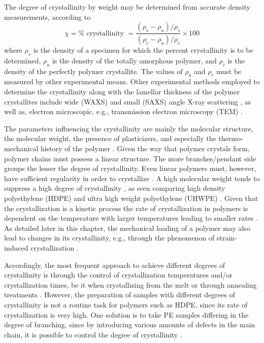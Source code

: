 The degree of crystallinity by weight may be determined from accurate density measurements, according to
\begin{equation}
	\chi = \% \text { crystallinity }=\frac{\left(\rho_{s}-\rho_{a}\right)/\rho_{s}}{\left(\rho_{c}-\rho_{a}\right)/\rho_{c}} \times 100
\end{equation}
where $\rho_{s}$ is the density of a specimen for which the percent crystallinity is to be determined, $\rho_{a}$ is the density of the totally amorphous polymer, and $\rho_{c}$ is the density of the perfectly polymer crystallite.
The values of $\rho_{a}$ and $\rho_{c}$ must be measured by other experimental means.
Other experimental methods employed to determine the crystallinity along with the lamellar thickness of the polymer crystallites include wide (WAXS) and small (SAXS) angle X-ray scattering \citep{schrauwenIntrinsicDeformationBehavior2004, hobeikaTemperatureStrainRate2000}, as well as, electron microscopic, e.g., transmission electron microscopy (TEM) \citep{bartczakEvolutionCrystallineTexture1992}.

The parameters influencing the crystallinity are mainly the molecular structure, the molecular weight, the presence of plasticizers, and especially the thermo-mechanical history of the polymer \citep{khouryMorphologyCrystallineSynthetic1976, cangemiTwoPhaseModelMechanical2001}.
Given the way that polymer crystals form, polymer chains must possess a linear structure.
The more branches/pendant side groups the lesser the degree of crystallinity.
Even linear polymers must, however, have sufficient regularity in order to crystallize \citep{khouryMorphologyCrystallineSynthetic1976}.
A high molecular weight tends to suppress a high degree of crystallinity \citep{hoffmanAnalysisRelaxationsPolychlorotrifluoroethylene2007}, as seen comparing high density polyethylene (HDPE) and ultra high weight polyethylene (UHWPE) \citep{brownInfluenceMolecularConformation2007}.
Given that the crystallization is a kinetic process the rate of crystallization in polymers is dependent on the temperature with larger temperatures leading to smaller rates \citep{callister2014materials}.
As detailed later in this chapter, the mechanical loading of a polymer may also lead to changes in its crystallinity, e.g., through the phenomenon of strain-induced crystallization \citep{raoStudyStraininducedCrystallization2001}.

Accordingly, the most frequent approach to achieve different degrees of crystallinity is through the control of crystallization temperatures and/or crystallization times, be it when crystallizing from the melt or through annealing treatments \citep{fakirovGlassTransitionTemperature2000, schrauwenIntrinsicDeformationBehavior2004}.
However, the preparation of samples with different degrees of crystallinity is not a routine task for polymers such as HDPE, since its rate of crystallization is very high.
One solution is to take PE samples differing in the degree of branching, since by introducing various amounts of defects in the main chain, it is possible to control the degree of crystallinity \citep{fakirovGlassTransitionTemperature2000}.

